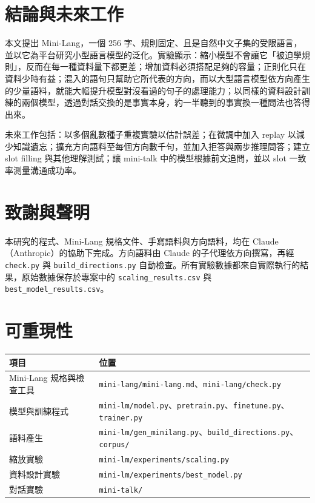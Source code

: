 \documentclass[11pt,a4paper]{article}
\begin{document}
\section{結論與未來工作}

本文提出 Mini-Lang，一個 256 字、規則固定、且是自然中文子集的受限語言，並以它為平台研究小型語言模型的泛化。實驗顯示：縮小模型不會讓它「被迫學規則」，反而在每一種資料量下都更差；增加資料必須搭配足夠的容量；正則化只在資料少時有益；混入的語句只幫助它所代表的方向，而以大型語言模型依方向產生的少量語料，就能大幅提升模型對沒看過的句子的處理能力；以同樣的資料設計訓練的兩個模型，透過對話交換的是事實本身，約一半聽到的事實換一種問法也答得出來。

未來工作包括：以多個亂數種子重複實驗以估計誤差；在微調中加入 replay 以減少知識遺忘；擴充方向語料至每個方向數千句，並加入拒答與兩步推理問答；建立 slot filling 與其他理解測試；讓 mini-talk 中的模型根據前文追問，並以 slot 一致率測量溝通成功率。

\section*{致謝與聲明}

本研究的程式、Mini-Lang 規格文件、手寫語料與方向語料，均在 Claude（Anthropic）的協助下完成。方向語料由 Claude 的子代理依方向撰寫，再經 \texttt{check.py} 與 \texttt{build\_directions.py} 自動檢查。所有實驗數據都來自實際執行的結果，原始數據保存於專案中的 \texttt{scaling\_results.csv} 與 \texttt{best\_model\_results.csv}。

\section*{可重現性}

\begin{table}[H]
\centering
\small
\begin{tabularx}{\linewidth}{lY}
\toprule
項目 & 位置 \\
\midrule
Mini-Lang 規格與檢查工具 & \texttt{mini-lang/mini-lang.md}、\texttt{mini-lang/check.py} \\
模型與訓練程式 & \texttt{mini-lm/model.py}、\texttt{pretrain.py}、\texttt{finetune.py}、\texttt{trainer.py} \\
語料產生 & \texttt{mini-lm/gen\_minilang.py}、\texttt{build\_directions.py}、\texttt{corpus/} \\
縮放實驗 & \texttt{mini-lm/experiments/scaling.py} \\
資料設計實驗 & \texttt{mini-lm/experiments/best\_model.py} \\
對話實驗 & \texttt{mini-talk/} \\
\bottomrule
\end{tabularx}
\end{table}
\end{document}
